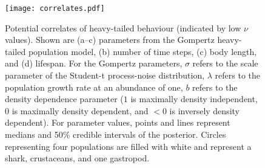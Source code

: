 \clearpage

\begin{figure}[htbp]
\begin{center}
\texttt{[image: correlates.pdf]}
\caption{
Potential correlates of heavy-tailed behaviour (indicated by low $\nu$ values). Shown are (a--c) parameters from the Gompertz heavy-tailed population model, (b) number of time steps, (c) body length, and (d) lifespan.
For the Gompertz parameters, $\sigma$ refers to the scale parameter of the Student-t process-noise distribution, $\lambda$ refers to the population growth rate at an abundance of one, $b$ refers to the density dependence parameter ($1$ is maximally density independent, $0$ is maximally density dependent, and $<0$ is inversely density dependent).
For parameter values, points and lines represent medians and 50\% credible intervals of the posterior.
Circles representing four populations are filled with white and represent a shark, crustaceans, and one gastropod.
}
\label{fig:correlates}
\end{center}
\end{figure}

\clearpage

